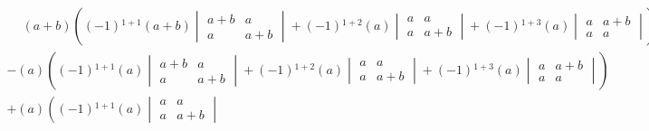 \[\begin{aligned}
\begin{aligned}
                &\phantom{+}
                (a + b)
                \left(
                    (-1){}^{1 + 1}
                    (a + b)
                    \begin{vmatrix}
                        a + b & a \\
                        a & a + b
                    \end{vmatrix}
                    +
                    (-1){}^{1 + 2}
                    (a)
                    \begin{vmatrix}
                        a & a \\
                        a & a + b
                    \end{vmatrix}
                    +
                    (-1){}^{1 + 3}
                    (a)
                    \begin{vmatrix}
                        a & a + b \\
                        a & a
                    \end{vmatrix}
                \right)
                \\
                &-
                (a)
                \left(
                    (-1){}^{1 + 1}
                    (a)
                    \begin{vmatrix}
                        a + b & a \\
                        a & a + b
                    \end{vmatrix}
                    +
                    (-1){}^{1 + 2}
                    (a)
                    \begin{vmatrix}
                        a & a \\
                        a & a + b
                    \end{vmatrix}
                    +
                    (-1){}^{1 + 3}
                    (a)
                    \begin{vmatrix}
                        a & a + b \\
                        a & a
                    \end{vmatrix}
                \right)
                \\
                &+
                (a)
                \left(
                    (-1){}^{1 + 1}
                    (a)
                    \begin{vmatrix}
                        a & a \\
                        a & a + b

\end{vmatrix}
\end{aligned}
\end{aligned}\]
